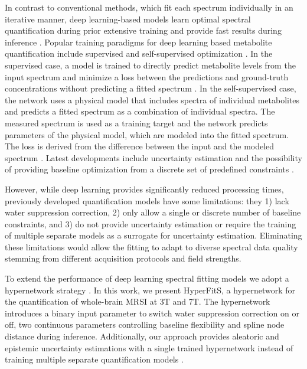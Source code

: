 \documentclass{article}
\begin{document}
    In contrast to conventional methods, which fit each spectrum individually in an iterative manner, deep learning-based models learn optimal spectral quantification during prior extensive training and provide fast results during inference \cite{shamaei2023physics, gurbani2019incorporation, osburg2025deep, turco2024tensorfit, hiltunen2002quantification, bhat2006fast, hatami2018magnetic, lee2019intact, chandler2019mrsnet, shamaei2021wavelet, rizzo2023quantification}. 
    Popular training paradigms for deep learning based metabolite quantification include supervised and self-supervised optimization \cite{merkofer2025strategies}. In the supervised case, a model is trained to directly predict metabolite levels from the input spectrum and minimize a loss between the predictions and ground-truth concentrations without predicting a fitted spectrum \cite{hatami2018magnetic, lee2019intact, chandler2019mrsnet, shamaei2021wavelet, iqbal2021deep}. In the self-supervised case, the network uses a physical model that includes spectra of individual metabolites and predicts a fitted spectrum as a combination of individual spectra. The measured spectrum is used as a training target and the network predicts parameters of the physical model, which are modeled into the fitted spectrum. The loss is derived from the difference between the input and the modeled spectrum \cite{shamaei2023physics, gurbani2019incorporation, chen2024magnetic}. Latest developments include uncertainty estimation and the possibility of providing baseline optimization from a discrete set of predefined constraints \cite{shamaei2026phive}. 

    However, while deep learning provides significantly reduced processing times, previously developed quantification models have some limitations: they 1) lack water suppression correction, 2) only allow a single or discrete number of baseline constraints, and 3) do not provide uncertainty estimation or require the training of multiple separate models as a surrogate for uncertainty estimation. Eliminating these limitations would allow the fitting to adapt to diverse spectral data quality stemming from different acquisition protocols and field strengths.
    
    To extend the performance of deep learning spectral fitting models we adopt a hypernetwork strategy \cite{schmidhuber1993self, ha2016hypernetworks, hoopes2021hypermorph}. In this work, we present HyperFitS, a hypernetwork for the quantification of whole-brain MRSI at 3T and 7T. The hypernetwork introduces a binary input parameter to switch water suppression correction on or off, two continuous parameters controlling baseline flexibility and spline node distance during inference. Additionally, our approach provides aleatoric and epistemic uncertainty estimations  with a single trained hypernetwork instead of training multiple separate quantification models \cite{krueger2017bayesian}.
    
\end{document}
